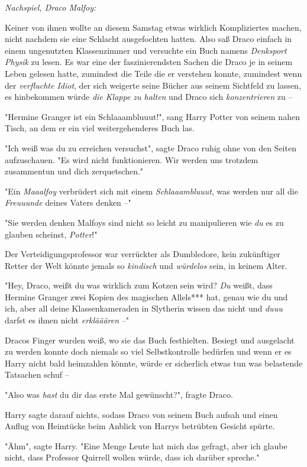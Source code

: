 {\emph{Nachspiel, Draco Malfoy:}

Keiner von ihnen wollte an diesem Samstag etwas wirklich Kompliziertes machen, nicht nachdem sie eine Schlacht ausgefochten hatten. Also saß Draco einfach in einem ungenutzten Klassenzimmer und versuchte ein Buch namens \emph{Denksport Physik} zu lesen. Es war eine der faszinierendsten Sachen die Draco je in seinem Leben gelesen hatte, zumindest die Teile die er verstehen konnte, zumindest wenn der \emph{verfluchte Idiot}, der sich weigerte seine Bücher aus seinem Sichtfeld zu lassen, es hinbekommen würde \emph{die Klappe zu halten} und Draco sich \emph{konzentrieren} zu --

"Hermine Granger ist ein Schlaaambluuut!", sang Harry Potter von seinem nahen Tisch, an dem er ein viel weitergehenderes Buch las.

"Ich weiß was du zu erreichen versuchst", sagte Draco ruhig ohne von den Seiten aufzuschauen. "Es wird nicht funktionieren. Wir werden uns trotzdem zusammentun und dich zerquetschen."

"Ein \emph{Maaalfoy} verbrüdert sich mit einem \emph{Schlaaambluuut}, was werden nur all die \emph{Freuuunde} deines Vaters denken --"

"Sie werden denken Malfoys sind nicht so leicht zu manipulieren wie \emph{du} es zu glauben scheinst, \emph{Potter}!"

Der Verteidigungsprofessor war verrückter als Dumbledore, kein zukünftiger Retter der Welt könnte jemals so \emph{kindisch} und \emph{würdelos} sein, in keinem Alter.

"Hey, Draco, weißt du was wirklich zum Kotzen sein wird? \emph{Du} weißt, dass Hermine Granger zwei Kopien des magischen Allels*** hat, genau wie du und ich, aber all deine Klassenkameraden in Slytherin wissen das nicht und \emph{duuu} darfst es ihnen nicht \emph{erklääären} --"

Dracos Finger wurden weiß, wo sie das Buch festhielten. Besiegt und ausgelacht zu werden konnte doch niemals so viel Selbstkontrolle bedürfen und wenn er es Harry nicht bald heimzahlen könnte, würde er sicherlich etwas tun was belastende Tatsachen schuf --

"Also was \emph{hast} du dir das erste Mal gewünscht?", fragte Draco.

Harry sagte darauf nichts, sodass Draco von seinem Buch aufsah und einen Anflug von Heimtücke beim Anblick von Harrys betrübten Gesicht spürte.

"Ähm", sagte Harry. "Eine Menge Leute hat mich das gefragt, aber ich glaube nicht, dass Professor Quirrell wollen würde, dass ich darüber spreche."

}
